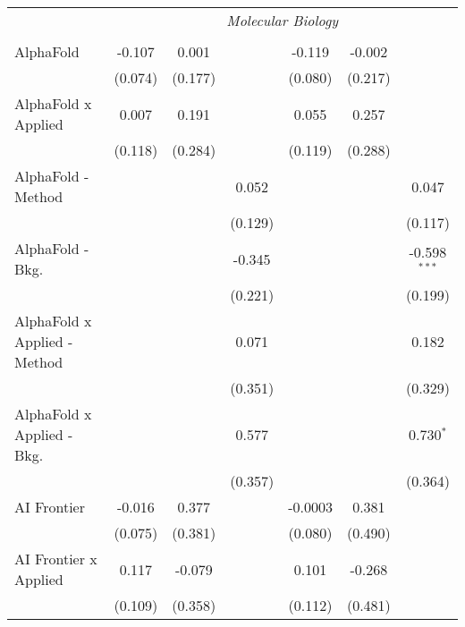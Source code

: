 \begin{tabular}{lcccccc}
 & \multicolumn{6}{c}{\textit{Molecular Biology}} \\ \\
   AlphaFold                      & -0.107      & 0.001        &               & -0.119       & -0.002       &   \\   
                                  & (0.074)     & (0.177)      &               & (0.080)      & (0.217)      &   \\   
   AlphaFold x Applied            & 0.007       & 0.191        &               & 0.055        & 0.257        &   \\   
                                  & (0.118)     & (0.284)      &               & (0.119)      & (0.288)      &   \\   
   AlphaFold - Method             &             &              & 0.052         &              &              & 0.047\\   
                                  &             &              & (0.129)       &              &              & (0.117)\\   
   AlphaFold - Bkg.               &             &              & -0.345        &              &              & -0.598$^{***}$\\   
                                  &             &              & (0.221)       &              &              & (0.199)\\   
   AlphaFold x Applied - Method   &             &              & 0.071         &              &              & 0.182\\   
                                  &             &              & (0.351)       &              &              & (0.329)\\   
   AlphaFold x Applied - Bkg.     &             &              & 0.577         &              &              & 0.730$^{*}$\\   
                                  &             &              & (0.357)       &              &              & (0.364)\\   
   AI Frontier                    & -0.016      & 0.377        &               & -0.0003      & 0.381        &   \\   
                                  & (0.075)     & (0.381)      &               & (0.080)      & (0.490)      &   \\   
   AI Frontier x Applied          & 0.117       & -0.079       &               & 0.101        & -0.268       &   \\   
                                  & (0.109)     & (0.358)      &               & (0.112)      & (0.481)      &   \\   

\end{tabular}
